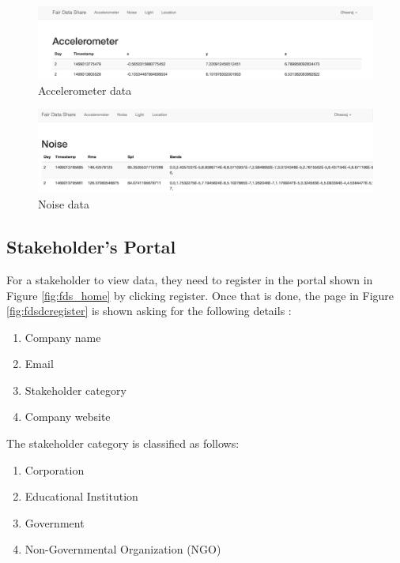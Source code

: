 \begin{figure}[ht!]
\centering
\includegraphics[width=\textwidth,keepaspectratio]{./images/fds_user_acc_full}
\caption{Accelerometer data\label{fig:fdsacc}}
\end{figure}

\begin{figure}[ht!]
\centering
\includegraphics[width=\textwidth,keepaspectratio]{./images/fds_user_noise_full}
\caption{Noise data \label{fig:fdsnoise}}
\end{figure}

\subsection{Stakeholder's Portal}

For a stakeholder to view data, they need to register in the portal shown in Figure \ref{fig:fds_home} by clicking register. Once that is done,
the page in Figure \ref{fig:fdsdcregister} is shown asking for the following details :

\begin{enumerate}
    \item Company name
    \item Email
    \item Stakeholder category
    \item Company website
\end{enumerate}

The stakeholder category is classified as follows:

\begin{enumerate}
    \item Corporation
    \item Educational Institution
    \item Government
    \item Non-Governmental Organization (NGO)
\end{enumerate}

